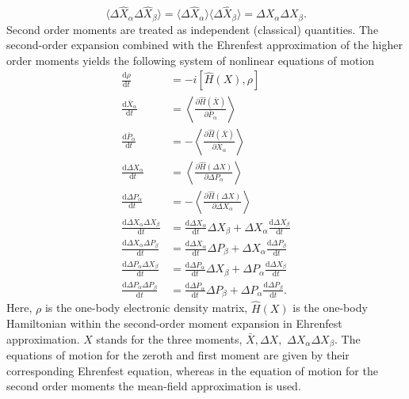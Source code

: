 \documentclass{article}
\newcommand{\dif}{\mathrm{d}}
\begin{document}
\begin{equation}
	\langle \Delta \hat{X}_\alpha \Delta \hat{X}_\beta \rangle = \langle \Delta \hat{X}_\alpha\rangle \langle \Delta \hat{X}_\beta\rangle= \Delta X_\alpha\Delta X_\beta.
\end{equation} 
Second order moments are treated as independent (classical) quantities.
The second-order expansion combined with the Ehrenfest approximation of the higher order moments yields the following system of nonlinear equations of motion
\begin{align*}
	\frac{\dif \rho }{\dif t} &= -i[\hat{H}(X),\rho]\\
	\frac{\dif \bar{X}_\alpha }{\dif t} &= \left\langle\frac{\partial \hat{H}(\bar{X})}{\partial \bar{P}_\alpha} \right\rangle \\
	\frac{\dif \bar{P}_\alpha }{\dif t} &= -\left\langle\frac{\partial \hat{H}(\bar{X})}{\partial \bar{X}_\alpha} \right\rangle \\
	\frac{\dif \Delta X_\alpha }{\dif t} &= \left\langle\frac{\partial \hat{H}(\Delta X)}{\partial \Delta P_\alpha} \right\rangle \\
	\frac{\dif \Delta P_\alpha }{\dif t} &= -\left\langle\frac{\partial \hat{H}(\Delta X)}{\partial \Delta X_\alpha} \right\rangle \\	
	\frac{\dif \Delta X_\alpha \Delta X_\beta}{\dif t} &=  \frac{\dif \Delta X_\alpha}{\dif t}\Delta X_\beta + \Delta X_\alpha\frac{\dif \Delta X_\beta}{\dif t}\\
	\frac{\dif \Delta X_\alpha \Delta P_\beta}{\dif t} &=  \frac{\dif \Delta X_\alpha}{\dif t}\Delta P_\beta + \Delta X_\alpha\frac{\dif \Delta P_\beta}{\dif t}\\
	\frac{\dif \Delta P_\alpha \Delta X_\beta}{\dif t} &=  \frac{\dif \Delta P_\alpha}{\dif t}\Delta X_\beta + \Delta P_\alpha\frac{\dif \Delta X_\beta}{\dif t}\\
	\frac{\dif \Delta P_\alpha \Delta P_\beta}{\dif t} &=  \frac{\dif \Delta P_\alpha}{\dif t}\Delta P_\beta + \Delta P_\alpha\frac{\dif \Delta P_\beta}{\dif t}.
\end{align*}
Here, $\rho$ is the one-body electronic density matrix, $\hat{H}(X)$ is the one-body Hamiltonian within the second-order moment expansion in Ehrenfest approximation. $X$ stands for the three moments, $\bar{X}, \Delta X,$ $\Delta X_\alpha \Delta X_\beta$. The equations of motion for the zeroth and first moment are given by their corresponding Ehrenfest equation, whereas in the equation of motion for the second order moments the mean-field approximation is used. 
\end{document}
